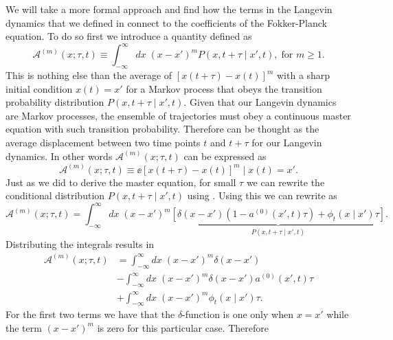 We will take a more formal approach and find how the terms in the Langevin
dynamics that we defined in  connect to the
coefficients of the Fokker-Planck equation. To do so first we introduce a
quantity defined as
\begin{equation}
    \mathcal{A}^{(m)}(x; \tau, t) \equiv \int_{-\infty}^\infty dx\;
    (x - x')^m P(x, t + \tau \mid x', t), \; \text{for } m \geq 1.
    \label{eq_compute_jump_mom}
\end{equation}
This is nothing else than the average of $[x(t + \tau) - x(t)]^m$ with a sharp
initial condition $x(t) = x'$ for a Markov process that obeys the transition
probability distribution $P(x, t + \tau \mid x', t)$. Given that our Langevin
dynamics are Markov processes, the ensemble of trajectories must obey a
continuous master equation with such transition probability. Therefore
 can be thought as the average displacement between
two time points $t$ and $t + \tau$ for our Langevin dynamics. In other words
$\mathcal{A}^{(m)}(x; \tau, t)$ can be expressed as
\begin{equation}
    \mathcal{A}^{(m)}(x; \tau, t) \equiv 
    \ee{\left[x(t + \tau) - x(t)\right]^m \mid x(t) = x'}.
    \label{eq_average_A}
\end{equation}
Just as we did to derive the master equation, for small $\tau$ we can rewrite
the conditional distribution $P(x, t + \tau \mid x', t)$ using
. Using this we can rewrite
 as
\begin{equation}
    \mathcal{A}^{(m)}(x; \tau, t) = \int_{-\infty}^\infty dx\; (x - x')^m
    \underbrace{
    \left[ \delta(x - x') \left( 1 - a^{(0)}(x', t) \tau \right) +
    \phi_t(x \mid x')\tau \right]
    }_{P(x, t + \tau \mid x', t)}.
\end{equation}
Distributing the integrals results in
\begin{equation}
    \begin{aligned}
    \mathcal{A}^{(m)}(x; \tau, t) &= 
    \int_{-\infty}^\infty dx\; (x - x')^m \delta(x - x') \\
    &- \int_{-\infty}^\infty dx\; (x - x')^m \delta(x - x') a^{(0)}(x', t) 
    \tau \\ 
    &+ \int_{-\infty}^\infty dx\; (x - x')^m \phi_t(x \mid x') \tau.
    \end{aligned}
\end{equation}
For the first two terms we have that the $\delta$-function is one only when $x
= x'$ while the term $(x - x')^m$ is zero for this particular case. Therefore
